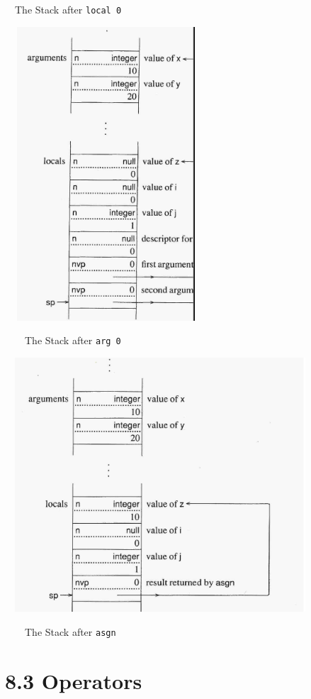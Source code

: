 \ \ The Stack after \texttt{local 0}


\bigskip


\bigskip


\bigskip


\bigskip


\ \  \includegraphics[width=2.6717in,height=4.3118in]{ib-img/ib-img053.jpg} 


\ \ \ \ The Stack after \texttt{arg 0}


\ \  \includegraphics[width=4.2752in,height=3.7335in]{ib-img/ib-img054.jpg} 


\ \ \ \ The Stack after \texttt{asgn}


\section[8.3 Operators]{8.3 \textbf{Operators}}

